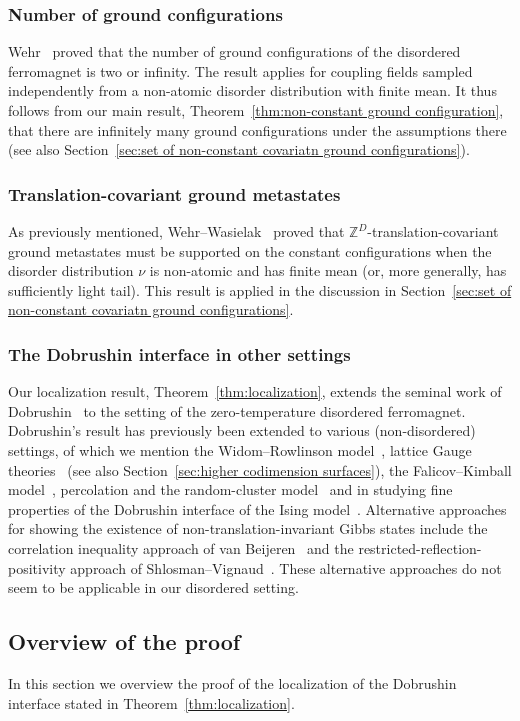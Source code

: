 \documentclass[11pt, reqno]{amsart}
\newcommand{\Z}{\mathbb{Z}}
\numberwithin{equation}{section}
\begin{document}
\subsubsection{Number of ground configurations} Wehr~\cite{W97} proved that the number of ground configurations of the disordered ferromagnet is two or infinity. The result applies for coupling fields sampled independently from a non-atomic disorder distribution with finite mean. It thus follows from our main result, Theorem~\ref{thm:non-constant ground configuration}, that there are infinitely many ground configurations under the assumptions there (see also Section~\ref{sec:set of non-constant covariatn ground configurations}).

\subsubsection{Translation-covariant ground metastates} As previously mentioned, Wehr--Wasielak~\cite{WW16} proved that $\Z^D$-translation-covariant ground metastates must be supported on the constant configurations when the disorder distribution $\nu$ is non-atomic and has finite mean (or, more generally, has sufficiently light tail). This result is applied in the discussion in Section~\ref{sec:set of non-constant covariatn ground configurations}.

\subsubsection{The Dobrushin interface in other settings} Our localization result, Theorem~\ref{thm:localization}, extends the seminal work of Dobrushin~\cite{Dob} to the setting of the zero-temperature disordered ferromagnet. Dobrushin's result has previously been extended to various (non-disordered) settings, of which we mention the Widom--Rowlinson model~\cites{BLPO79, BLP79}, lattice Gauge theories~\cite{B84} (see also Section~\ref{sec:higher codimension surfaces}), the Falicov–Kimball model~\cite{DMN00}, percolation and the random-cluster model~\cites{GG02,CK03} and in studying fine properties of the Dobrushin interface of the Ising model~\cite{GL}. Alternative approaches for showing the existence of non-translation-invariant Gibbs states include the correlation inequality approach of van Beijeren~\cite{vB} and the restricted-reflection-positivity approach of Shlosman--Vignaud~\cite{SV07}. These alternative approaches do not seem to be applicable in our disordered setting.

\subsection{Overview of the proof}
\label{subsec:overview}
In this section we overview the proof of the localization of the Dobrushin interface stated in Theorem~\ref{thm:localization}.
\end{document}
